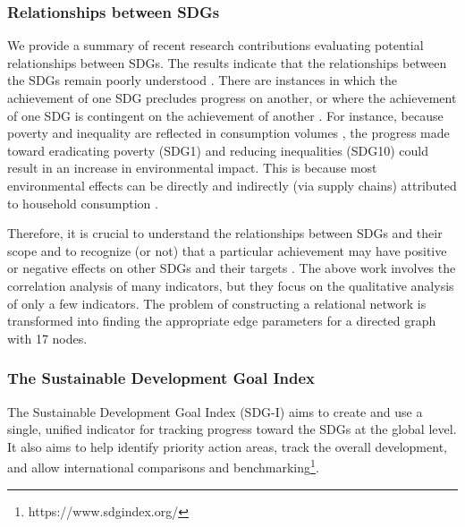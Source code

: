 \documentclass[10pt]{mcmthesis}
\begin{document}
\subsubsection{ Relationships between SDGs }
We provide a summary of recent research contributions evaluating potential relationships between SDGs. The results indicate that the relationships between the SDGs remain poorly understood \cite{allen2018initial}. There are instances in which the achievement of one SDG precludes progress on another, or where the achievement of one SDG is contingent on the achievement of another \cite{nilsson2016policy}. For instance, because poverty and inequality are reflected in consumption volumes \cite{aguiar2015has}, the progress made toward eradicating poverty (SDG1) and reducing inequalities (SDG10) could result in an increase in environmental impact. This is because most environmental effects can be directly and indirectly (via supply chains) attributed to household consumption \cite{ivanova2016environmental}.

Therefore, it is crucial to understand the relationships between SDGs and their scope and to recognize (or not) that a particular achievement may have positive or negative effects on other SDGs and their targets \cite{biggeri2019tracking}. The above work involves the correlation analysis of many indicators, but they focus on the qualitative analysis of only a few indicators.
The problem of constructing a relational network is transformed into finding the appropriate edge parameters for a directed graph with 17 nodes.



\subsubsection{ The Sustainable Development Goal Index }
The Sustainable Development Goal Index (SDG-I) \cite{stiftung2018sustainable} aims to create and use a single, unified indicator for tracking progress toward the SDGs at the global level. It also aims to help identify priority action areas, track the overall development, and allow international comparisons and benchmarking\footnote{https://www.sdgindex.org/}.
\end{document}
